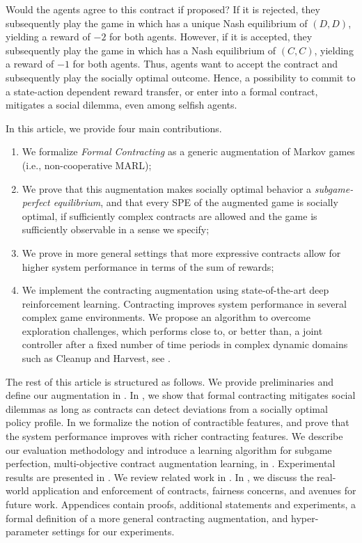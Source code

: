 \documentclass[referee,sn-basic]{sn-jnl}
\theoremstyle{thmstyleone}%
\theoremstyle{thmstyletwo}%
\theoremstyle{thmstylethree}%
\begin{document}
Would the agents agree to this contract if proposed? If it is rejected, they subsequently play the game in  which has a unique Nash equilibrium of $(D, D)$, yielding a reward of $-2$ for both agents. However, if it is accepted, they subsequently play the game in  which has a Nash equilibrium of $(C, C)$, yielding a reward of $-1$ for both agents. Thus, agents want to accept the contract and subsequently play the socially optimal outcome. Hence, a possibility to commit to a state-action dependent reward transfer, or enter into a formal contract, mitigates a social dilemma, even among selfish agents.

In this article, we provide four main contributions. 
\begin{enumerate}
\item We formalize \emph{Formal Contracting} as a generic augmentation of Markov games (i.e., non-cooperative MARL);
\item We prove that this augmentation makes socially optimal behavior a \emph{subgame-perfect equilibrium}, and that every SPE of the augmented game is socially optimal, if sufficiently complex contracts are allowed and the game is sufficiently observable in a sense we specify;
\item We prove in more general settings that more expressive contracts allow for higher system performance in terms of the sum of rewards;
\item We implement the contracting augmentation using state-of-the-art deep reinforcement learning. Contracting improves system performance in several complex game environments. We propose an algorithm to overcome exploration challenges, which performs close to, or better than, a joint controller after a fixed number of time periods in complex dynamic domains such as Cleanup and Harvest, see \cite{hughes2018inequity}. 
\end{enumerate}
The rest of this article is structured as follows. We provide preliminaries and define our augmentation in . In , we show that formal contracting mitigates social dilemmas as long as contracts can detect deviations from a socially optimal policy profile. In  we formalize the notion of contractible features, and prove that the system performance improves with richer contracting features. We describe our evaluation methodology and introduce a learning algorithm for subgame perfection, multi-objective contract augmentation learning, in . Experimental results are presented in . We review related work in . In , we discuss the real-world application and enforcement of contracts, fairness concerns, and avenues for future work. Appendices contain proofs, additional statements and experiments, a formal definition of a more general contracting augmentation, and hyper-parameter settings for our experiments.
\end{document}

